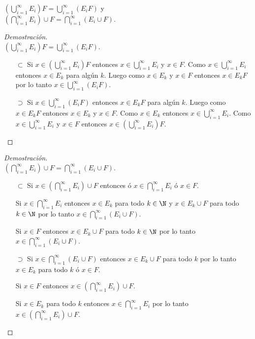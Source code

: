 \item $\left( \bigcup_{i=1}^\infty E_i \right) F = \bigcup_{i=1}^\infty (E_i F)$ y\\
$\left( \bigcap_{i=1}^\infty E_i \right) \cup F = \bigcap_{i=1}^\infty (E_i \cup F)$.

\begin{proof}[Demostración]\ \\$\left( \bigcup_{i=1}^\infty E_i \right) F = \bigcup_{i=1}^\infty (E_i F)$.
    \begin{itemize}
        \item[$\subset$] Si $x \in \left( \bigcup_{i=1}^\infty E_i \right) F$ entonces $x \in \bigcup_{i=1}^\infty E_i$ y $x \in F$. Como $x \in \bigcup_{i=1}^\infty E_i$ entonces $x \in E_k$ para algún $k$. Luego como $x \in E_k$ y $x \in F$ entonces $x \in E_k F$ por lo tanto $x \in \bigcup_{i=1}^\infty (E_i F)$.
        \item[$\supset$] Si $x \in \bigcup_{i=1}^\infty (E_i F)$ entonces $x \in E_k F$ para algún $k$. Luego como $x \in E_k F$ entonces $x \in E_k$ y $x \in F$. Como $x \in E_k$ entonces $x \in \bigcup_{i=1}^\infty E_i$. Como $x \in \bigcup_{i=1}^\infty E_i$ y $x \in F$ entonces $x \in \left( \bigcup_{i=1}^\infty E_i \right) F$. \qedhere
    \end{itemize}
\end{proof}

\begin{proof}[Demostración]\ \\
$\left( \bigcap_{i=1}^\infty E_i \right) \cup F = \bigcap_{i=1}^\infty (E_i \cup F)$.

    \begin{itemize}
        \item[$\subset$] Si $x \in \left( \bigcap_{i=1}^\infty E_i \right) \cup F$ entonces ó $x \in \bigcap_{i=1}^\infty E_i$ ó $x \in F$. 

        Si $x \in \bigcap_{i=1}^\infty E_i$ entonces $x \in E_k$ para todo $k \in \N$ y $x \in E_k \cup F$ para todo $k \in \N$ por lo tanto $x \in \bigcap_{i=1}^\infty (E_i \cup F)$.

        Si $x \in F$ entonces $x \in E_k \cup F$ para todo $k \in \N$ por lo tanto $x \in \bigcap_{i=1}^\infty (E_i \cup F)$.
        
        \item[$\supset$] Si $x \in \bigcap_{i=1}^\infty (E_i \cup F)$ entonces $x \in E_k \cup F$ para todo $k$ por lo tanto $x \in E_k$ para todo $k$ ó $x \in F$. 

        Si $x \in F$ entonces $x \in \left( \bigcap_{i=1}^\infty E_i \right) \cup F$.
        
        Si $x \in E_k$ para todo $k$ entonces $x \in \bigcap_{i=1}^\infty E_i$ por lo tanto $x \in \left( \bigcap_{i=1}^\infty E_i \right) \cup F$. \qedhere
    \end{itemize}
\end{proof}